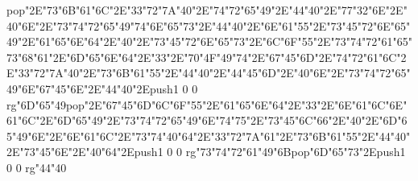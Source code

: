 pop{}\ipa\char"2E\ipa\char"73\ipa\char"6B\ipa\char"61\ipa\char"6C\ipa\char"2E\ipa\char"33\ipa\char"72\ipa\char"7A\medskip\ipa\char"40\ipa\char"2E\ipa\char"74\ipa\char"72\ipa\char"65\ipa\char"49\ipa\char"2E\ipa\char"44\ipa\char"40\ipa\char"2E\ipa\char"77\ipa\char"32\ipa\char"6E\ipa\char"2E\ipa\char"40\ipa\char"6E\ipa\char"2E\ipa\char"73\ipa\char"74\ipa\char"72\ipa\char"65\ipa\char"49\ipa\char"74\medskip\ipa\char"6E\ipa\char"65\ipa\char"73\ipa\char"2E\ipa\char"44\ipa\char"40\ipa\char"2E\ipa\char"6E\ipa\char"61\ipa\char"55\ipa\char"2E\ipa\char"73\ipa\char"45\ipa\char"72\medskip\vfill\eject\ipa\char"6E\ipa\char"65\ipa\char"49\ipa\char"2E\ipa\char"61\ipa\char"65\ipa\char"6E\ipa\char"64\ipa\char"2E\ipa\char"40\ipa\char"2E\ipa\char"73\ipa\char"45\ipa\char"72\medskip\ipa\char"6E\ipa\char"65\ipa\char"73\ipa\char"2E\ipa\char"6C\ipa\char"6F\ipa\char"55\ipa\char"2E\ipa\char"73\ipa\char"74\ipa\char"72\ipa\char"61\ipa\char"65\ipa\char"73\medskip\ipa\char"68\ipa\char"61\ipa\char"2E\ipa\char"6D\ipa\char"65\ipa\char"6E\ipa\char"64\ipa\char"2E\ipa\char"33\ipa\char"2E\ipa\char"70\ipa\char"4F\ipa\char"49\ipa\char"74\ipa\char"2E\ipa\char"67\ipa\char"45\ipa\char"6D\ipa\char"2E\ipa\char"74\ipa\char"72\ipa\char"61\ipa\char"6C\ipa\char"2E\ipa\char"33\ipa\char"72\ipa\char"7A\medskip\ipa\char"40\ipa\char"2E\ipa\char"73\ipa\char"6B\ipa\char"61\ipa\char"55\ipa\char"2E\ipa\char"44\ipa\char"40\ipa\char"2E\ipa\char"44\ipa\char"45\ipa\char"6D\ipa\char"2E\ipa\char"40\ipa\char"6E\ipa\char"2E\ipa\char"73\ipa\char"74\ipa\char"72\ipa\char"65\ipa\char"49\ipa\char"6E\medskip\ipa\char"67\ipa\char"45\ipa\char"6E\ipa\char"2E\ipa\char"44\ipa\char"40\ipa\char"2E\pdfcolorstack\match push{1 0 0 rg}\ipa\char"6D\ipa\char"65\ipa\char"49\pdfcolorstack\match pop{}\ipa\char"2E\ipa\char"67\ipa\char"45\ipa\char"6D\medskip\vfill\eject\ipa\char"6C\ipa\char"6F\ipa\char"55\ipa\char"2E\ipa\char"61\ipa\char"65\ipa\char"6E\ipa\char"64\ipa\char"2E\ipa\char"33\ipa\char"2E\ipa\char"6E\ipa\char"61\ipa\char"6C\medskip\ipa\char"6E\ipa\char"61\ipa\char"6C\ipa\char"2E\ipa\char"6D\ipa\char"65\ipa\char"49\ipa\char"2E\ipa\char"73\ipa\char"74\ipa\char"72\ipa\char"65\ipa\char"49\ipa\char"6E\medskip\ipa\char"74\ipa\char"75\ipa\char"2E\ipa\char"73\ipa\char"45\ipa\char"6C\ipa\char"66\ipa\char"2E\ipa\char"40\ipa\char"2E\ipa\char"6D\ipa\char"65\ipa\char"49\ipa\char"6E\ipa\char"2E\ipa\char"6E\ipa\char"61\ipa\char"6C\ipa\char"2E\ipa\char"73\ipa\char"74\ipa\char"40\ipa\char"64\ipa\char"2E\ipa\char"33\ipa\char"72\ipa\char"7A\medskip\ipa\char"61\ipa\char"2E\ipa\char"73\ipa\char"6B\ipa\char"61\ipa\char"55\ipa\char"2E\ipa\char"44\ipa\char"40\ipa\char"2E\ipa\char"73\ipa\char"45\ipa\char"6E\ipa\char"2E\ipa\char"40\ipa\char"64\ipa\char"2E\pdfcolorstack\match push{1 0 0 rg}\ipa\char"73\ipa\char"74\ipa\char"72\ipa\char"61\ipa\char"49\ipa\char"6B\pdfcolorstack\match pop{}\medskip\ipa\char"6D\ipa\char"65\ipa\char"73\ipa\char"2E\pdfcolorstack\match push{1 0 0 rg}\ipa\char"44\ipa\char"40\pdfcolorstack\match 
